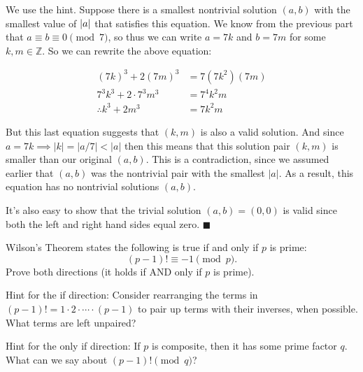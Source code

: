 \documentclass[11pt]{article}
\begin{document}
\begin{Parts}

\begin{solution}
  We use the hint. Suppose there is a smallest nontrivial solution $(a, b)$ with the smallest value of $\left\lvert a \right\rvert$ that satisfies this equation. We know from the previous part that $a \equiv b \equiv 0 \pmod 7$, so thus we can write $a = 7k$ and $b = 7m$ for some $k, m \in \mathbb Z$. So we can rewrite the above equation: 

  \begin{align*}
    (7k)^3 + 2(7m)^3 &= 7(7k^2)(7m)\\
    7^3 k^3 + 2 \cdot 7^3m^3 &= 7^4k^2m\\
    \therefore k^3 + 2m^3 &= 7k^2m
  \end{align*}

  But this last equation suggests that $(k, m)$ is also a valid solution. And since $a = 7k \implies |k| = |a/7| < |a|$ then this means that this solution pair $(k, m)$ is smaller than our original $(a, b)$. This is a contradiction, since we assumed earlier that $(a, b)$ was the nontrivial pair with the smallest $|a|$. As a result, this equation has no nontrivial solutions $(a, b)$. 

  It's also easy to show that the trivial solution $(a, b) = (0, 0)$ is valid since both the left and right hand sides equal zero. $\blacksquare$
\end{solution}

\end{Parts}
\pagebreak 
{}

Wilson's Theorem states the following is true if and only if $p$ is prime:
    \[(p - 1)! \equiv -1 \pmod{p}.\]
Prove both directions (it holds if AND only if $p$ is prime).

Hint for the if direction: Consider rearranging the terms in $(p - 1)! = 1 \cdot 2 \cdot \cdots \cdot (p - 1)$ to pair up terms with their inverses, when possible. What terms are left unpaired?

Hint for the only if direction: If $p$ is composite, then it has some prime factor $q$.  What can we say about $(p-1)! \pmod{q}$?
\end{document}

